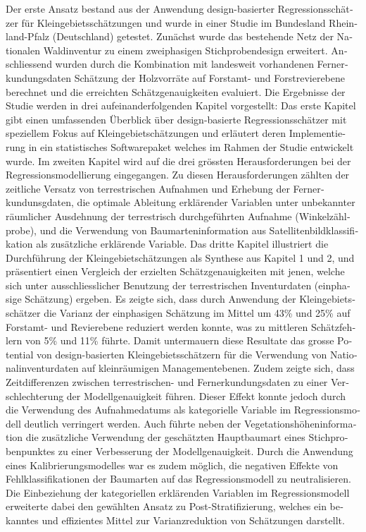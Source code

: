 \begin{otherlanguage}{ngerman}
Der erste Ansatz bestand aus der Anwendung design-basierter Regressionsschätzer für Kleingebietsschätzungen und wurde in einer Studie im Bundesland Rheinland-Pfalz (Deutschland) getestet. Zunächst wurde das bestehende Netz der Nationalen Waldinventur zu einem zweiphasigen Stichprobendesign erweitert. Anschliessend wurden durch die Kombination mit landesweit vorhandenen Fernerkundungsdaten Schätzung der Holzvorräte auf Forstamt- und Forstrevierebene berechnet und die erreichten Schätzgenauigkeiten evaluiert. Die Ergebnisse der Studie werden in drei aufeinanderfolgenden Kapitel vorgestellt: Das erste Kapitel gibt einen umfassenden Überblick über design-basierte Regressionsschätzer mit speziellem Fokus auf Kleingebietschätzungen und erläutert deren Implementierung in ein statistisches Softwarepaket welches im Rahmen der Studie entwickelt wurde. Im zweiten Kapitel wird auf die drei grössten Herausforderungen bei der Regressionsmodellierung eingegangen. Zu diesen Herausforderungen zählten der zeitliche Versatz von terrestrischen Aufnahmen und Erhebung der Fernerkundunsgdaten, die optimale Ableitung erklärender Variablen unter unbekannter räumlicher Ausdehnung der terrestrisch durchgeführten Aufnahme (Winkelzählprobe), und die Verwendung von Baumarteninformation aus Satellitenbildklassifikation als zusätzliche erklärende Variable. Das dritte Kapitel illustriert die Durchführung der Kleingebietschätzungen als Synthese aus Kapitel 1 und 2, und präsentiert einen Vergleich der erzielten Schätzgenauigkeiten mit jenen, welche sich unter ausschliesslicher Benutzung der terrestrischen Inventurdaten (einphasige Schätzung) ergeben. Es zeigte sich, dass durch Anwendung der Kleingebietsschätzer die Varianz der einphasigen Schätzung im Mittel um 43\% und 25\% auf Forstamt- und Revierebene reduziert werden konnte, was zu mittleren Schätzfehlern von 5\% und 11\% führte. Damit untermauern diese Resultate das grosse Potential von design-basierten Kleingebietsschätzern für die Verwendung von Nationalinventurdaten auf kleinräumigen Managementebenen. Zudem zeigte sich, dass Zeitdifferenzen zwischen terrestrischen- und Fernerkundungsdaten zu einer Verschlechterung der Modellgenauigkeit führen. Dieser Effekt konnte jedoch durch die Verwendung des Aufnahmedatums als kategorielle Variable im Regressionsmodell deutlich verringert werden. Auch führte neben der Vegetationshöheninformation die zusätzliche Verwendung der geschätzten Hauptbaumart eines Stichprobenpunktes zu einer Verbesserung der Modellgenauigkeit. Durch die Anwendung eines Kalibrierungsmodelles war es zudem möglich, die negativen Effekte von Fehlklassifikationen der Baumarten auf das Regressionsmodell zu neutralisieren. Die Einbeziehung der kategoriellen erklärenden Variablen im Regressionsmodell erweiterte dabei den gewählten Ansatz zu Post-Stratifizierung, welches ein bekanntes und effizientes Mittel zur Varianzreduktion von Schätzungen darstellt.\par


\end{otherlanguage}
